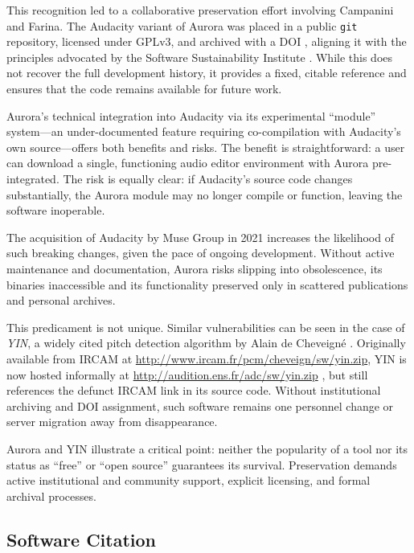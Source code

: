 This recognition led to a collaborative preservation effort involving Campanini and Farina. The Audacity variant of Aurora was placed in a public \texttt{git} repository, licensed under GPLv3, and archived with a DOI \cite{farina_aurora_2025}, aligning it with the principles advocated by the Software Sustainability Institute \cite{hong_how_2019}. While this does not recover the full development history, it provides a fixed, citable reference and ensures that the code remains available for future work.

Aurora’s technical integration into Audacity via its experimental “module” system—an under-documented feature requiring co-compilation with Audacity’s own source—offers both benefits and risks. The benefit is straightforward: a user can download a single, functioning audio editor environment with Aurora pre-integrated. The risk is equally clear: if Audacity’s source code changes substantially, the Aurora module may no longer compile or function, leaving the software inoperable.

The acquisition of Audacity by Muse Group in 2021 \cite{prokoudine_ultimate_2021} increases the likelihood of such breaking changes, given the pace of ongoing development. Without active maintenance and documentation, Aurora risks slipping into obsolescence, its binaries inaccessible and its functionality preserved only in scattered publications and personal archives.

This predicament is not unique. Similar vulnerabilities can be seen in the case of \emph{YIN}, a widely cited pitch detection algorithm by Alain de Cheveigné \cite{cheveigne_yin_2002}. Originally available from IRCAM at \url{http://www.ircam.fr/pcm/cheveign/sw/yin.zip}, YIN is now hosted informally at \url{http://audition.ens.fr/adc/sw/yin.zip} \cite{alain_cancellation_2023}, but still references the defunct IRCAM link in its source code. Without institutional archiving and DOI assignment, such software remains one personnel change or server migration away from disappearance.

Aurora and YIN illustrate a critical point: neither the popularity of a tool nor its status as “free” or “open source” guarantees its survival. Preservation demands active institutional and community support, explicit licensing, and formal archival processes.

\subsection{Software Citation}

